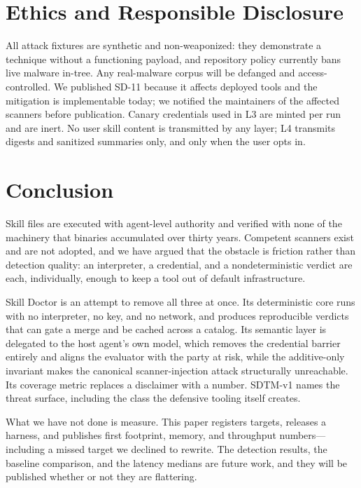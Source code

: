\documentclass[11pt]{article}
\begin{document}
\section{Ethics and Responsible Disclosure}

All attack fixtures are synthetic and non-weaponized: they demonstrate a technique without a functioning payload, and repository policy currently bans live malware in-tree. Any real-malware corpus will be defanged and access-controlled. We published SD-11 because it affects deployed tools and the mitigation is implementable today; we notified the maintainers of the affected scanners before publication. Canary credentials used in L3 are minted per run and are inert. No user skill content is transmitted by any layer; L4 transmits digests and sanitized summaries only, and only when the user opts in.

\section{Conclusion}

Skill files are executed with agent-level authority and verified with none of the machinery that binaries accumulated over thirty years. Competent scanners exist and are not adopted, and we have argued that the obstacle is friction rather than detection quality: an interpreter, a credential, and a nondeterministic verdict are each, individually, enough to keep a tool out of default infrastructure.

Skill Doctor is an attempt to remove all three at once. Its deterministic core runs with no interpreter, no key, and no network, and produces reproducible verdicts that can gate a merge and be cached across a catalog. Its semantic layer is delegated to the host agent's own model, which removes the credential barrier entirely and aligns the evaluator with the party at risk, while the additive-only invariant makes the canonical scanner-injection attack structurally unreachable. Its coverage metric replaces a disclaimer with a number. SDTM-v1 names the threat surface, including the class the defensive tooling itself creates.

What we have not done is measure. This paper registers targets, releases a harness, and publishes first footprint, memory, and throughput numbers---including a missed target we declined to rewrite. The detection results, the baseline comparison, and the latency medians are future work, and they will be published whether or not they are flattering.
\end{document}
